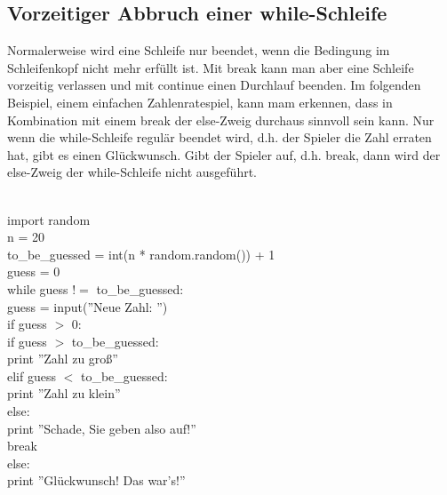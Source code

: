\subsection{Vorzeitiger Abbruch einer while-Schleife}
Normalerweise wird eine Schleife nur beendet, wenn die Bedingung im Schleifenkopf nicht mehr erfüllt ist. Mit break kann man aber eine Schleife vorzeitig verlassen und mit continue einen Durchlauf beenden.
Im folgenden Beispiel, einem einfachen Zahlenratespiel, kann mam erkennen, dass in Kombination mit einem break der else-Zweig durchaus sinnvoll sein kann. Nur wenn die while-Schleife regulär beendet wird, d.h. der Spieler die Zahl erraten hat, gibt es einen Glückwunsch. Gibt der Spieler auf, d.h. break, dann wird der else-Zweig der while-Schleife nicht ausgeführt. \\
\\
\begin{MyConsoleBox}{
import random												\\
n = 20														\\
to\_be\_guessed = int(n * random.random()) + 1				\\
guess = 0													\\
while guess $!=$ to\_be\_guessed:							\\
\hspace{0.5cm}    guess = input(''Neue Zahl: '')			\\
\hspace{0.5cm}    if guess $>$ 0:							\\
\hspace{1.0cm}        if guess $>$ to\_be\_guessed:			\\
\hspace{1.5cm}            print ''Zahl zu groß''			\\
\hspace{1.0cm}        elif guess $<$ to\_be\_guessed:		\\
\hspace{1.5cm}            print ''Zahl zu klein''			\\
\hspace{0.5cm}    else:										\\
\hspace{1.0cm}        print ''Schade, Sie geben also auf!'' \\
\hspace{1.0cm}        break									\\
else:														\\
\hspace{0.5cm}    print ''Glückwunsch! Das war's!'' 		\\
}\end{MyConsoleBox}
\\
